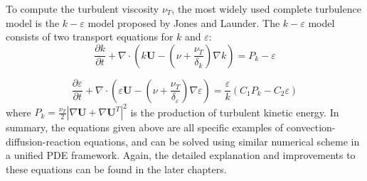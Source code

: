 To compute the turbulent viscosity $\nu_T$, the most widely used complete turbulence model is the $k-\varepsilon$ model proposed by Jones and Launder\cite{}. The $k-\varepsilon$ model consists of two transport equations for $k$ and $\varepsilon$:
\begin{equation} 
\frac{\partial k}{\partial t}
+\nabla\cdot(k\mathbf{U}
-(\nu+\frac{\nu_T}{\delta_k})\nabla k) 
= P_k - \varepsilon
\label{eq:k_eqn} 
\end{equation}

\begin{equation} 
\frac{\partial
\varepsilon}{\partial t}+\nabla\cdot(\varepsilon \mathbf{U}
-(\nu+\frac{\nu_T}{\delta_\varepsilon})\nabla \varepsilon)
=\frac{\varepsilon}{k}(C_1P_k-C_2\varepsilon) \label{eq:eps_eqn} \end{equation}
where $P_k = \frac{\nu_T}{2}|\nabla \mathbf{U} + \nabla \mathbf{U}^T|^2$ is the production of turbulent kinetic energy. In summary, the equations given above are all specific examples of convection-diffusion-reaction equations, and can be solved using similar numerical scheme in a unified PDE framework. Again, the detailed explanation and improvements to these equations can be found in the later chapters.

